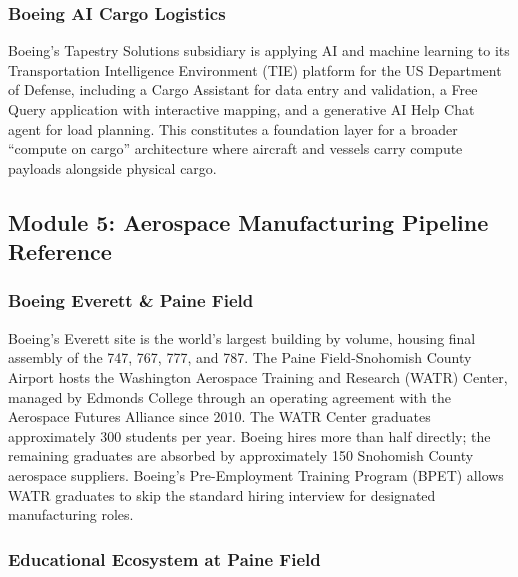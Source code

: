 \documentclass[11pt,letterpaper]{article}
\begin{document}
\subsubsection{Boeing AI Cargo Logistics}

Boeing's Tapestry Solutions subsidiary is applying AI and machine learning to its Transportation Intelligence Environment (TIE) platform for the US Department of Defense, including a Cargo Assistant for data entry and validation, a Free Query application with interactive mapping, and a generative AI Help Chat agent for load planning. This constitutes a foundation layer for a broader ``compute on cargo'' architecture where aircraft and vessels carry compute payloads alongside physical cargo.

\subsection{Module 5: Aerospace Manufacturing Pipeline Reference}

\subsubsection{Boeing Everett \& Paine Field}

Boeing's Everett site is the world's largest building by volume, housing final assembly of the 747, 767, 777, and 787. The Paine Field-Snohomish County Airport hosts the Washington Aerospace Training and Research (WATR) Center, managed by Edmonds College through an operating agreement with the Aerospace Futures Alliance since 2010. The WATR Center graduates approximately 300 students per year. Boeing hires more than half directly; the remaining graduates are absorbed by approximately 150 Snohomish County aerospace suppliers. Boeing's Pre-Employment Training Program (BPET) allows WATR graduates to skip the standard hiring interview for designated manufacturing roles.

\subsubsection{Educational Ecosystem at Paine Field}
\end{document}
